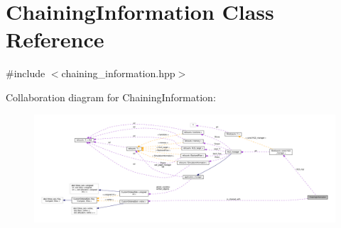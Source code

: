 \hypertarget{classChainingInformation}{}\section{Chaining\+Information Class Reference}
\label{classChainingInformation}


{\ttfamily \#include $<$chaining\+\_\+information.\+hpp$>$}



Collaboration diagram for Chaining\+Information\+:
\nopagebreak
\begin{figure}[H]
\begin{center}
\leavevmode
\includegraphics[width=350pt]{d1/d92/classChainingInformation__coll__graph}
\end{center}
\end{figure}
